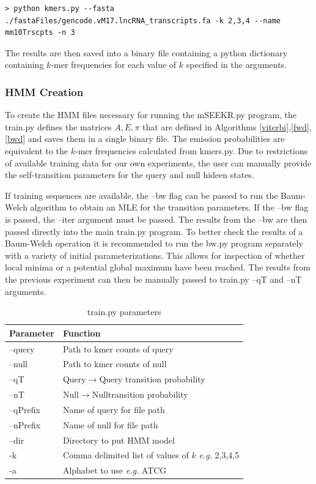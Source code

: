 \begin{verbatim}
> python kmers.py --fasta ./fastaFiles/gencode.vM17.lncRNA_transcripts.fa -k 2,3,4 --name mm10Trscpts -n 3
\end{verbatim}

The results are then saved into a binary file containing a python dictionary containing $k$-mer frequencies for each value of $k$ specified in the arguments. 

\subsubsection{HMM Creation}
To create the HMM files necessary for running the mSEEKR.py program, the train.py defines the matrices $A,E,\pi$ that are defined in Algorithms \ref{viterbi},\ref{fwd},\ref{bwd} and saves them in a single binary file. The emission probabilities are equivalent to the $k$-mer frequencies calculated from kmers.py. Due to restrictions of available training data for our own experiments, the user can manually provide the self-transition parameters for the query and null hideen states.

If training sequences are available, the --bw flag can be passed to run the Baum-Welch algorithm to obtain an MLE for the transition parameters. If the --bw flag is passed, the --iter argument must be passed. The results from the --bw are then passed directly into the main train.py program. To better check the results of a Baum-Welch operation it is recommended to run the bw.py program separately with a variety of initial parameterizations. This allows for inspection of whether local minima or a potential global maximum have been reached. The results from the previous experiment can then be manually passed to train.py --qT and --nT arguments.
\begin{table}[h]
\centering
 \begin{tabular}{|l l|}
 \hline
 Parameter & Function\\
 \hline
 --query & Path to kmer counts of query \\
 --null & Path to kmer counts of null \\
 --qT & Query$\rightarrow$Query transition probability \\
 --nT & Null$\rightarrow$Nulltransition probability \\
 --qPrefix & Name of query for file path \\
 --nPrefix & Name of null for file path\\
 --dir & Directory to put HMM model \\
 -k & Comma delimited list of values of $k$ \emph{e.g.} 2,3,4,5\\
 -a & Alphabet to use \emph{e.g.} ATCG\\
 \hline
 
\end{tabular}
\caption{train.py parameters}
\label{tab:trainparams}
\end{table}
\linebreak

